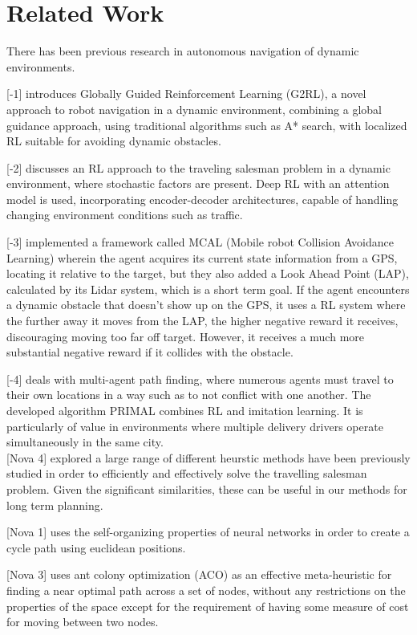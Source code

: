 \documentclass{article}
\begin{document}
	\section{Related Work}
	
	There has been previous research in autonomous navigation of dynamic environments. 
	
	[-1] introduces Globally Guided Reinforcement Learning (G2RL), a novel approach to robot navigation in a dynamic environment, combining a global guidance approach, using traditional algorithms such as A* search, with localized RL suitable for avoiding dynamic obstacles.
	
	[-2] discusses an RL approach to the traveling salesman problem in a dynamic environment, where stochastic factors are present. Deep RL with an attention model is used, incorporating encoder-decoder architectures, capable of handling changing environment conditions such as traffic. 
	
	[-3] implemented a framework called MCAL (Mobile robot Collision Avoidance Learning) wherein the agent acquires its current state information from a GPS, locating it relative to the target, but they also added a Look Ahead Point (LAP), calculated by its Lidar system, which is a short term goal. If the agent encounters a dynamic obstacle that doesn’t show up on the GPS, it uses a RL system where the further away it moves from the LAP, the higher negative reward it receives, discouraging moving too far off target. However, it receives a much more substantial negative reward if it collides with the obstacle.
	
	[-4] deals with multi-agent path finding, where numerous agents must travel to their own locations in a way such as to not conflict with one another. The developed algorithm PRIMAL combines RL and imitation learning. It is particularly of value in environments where multiple delivery drivers operate simultaneously in the same city.
	\\

	[Nova 4] explored a large range of different heurstic methods have been previously studied in order to efficiently and effectively solve the travelling salesman problem. Given the significant similarities, these can be useful in our methods for long term planning.
	
	[Nova 1] uses the self-organizing properties of neural networks in order to create a cycle path using euclidean positions.
	
	[Nova 3] uses ant colony optimization (ACO) as an effective meta-heuristic for finding a near optimal path across a set of nodes, without any restrictions on the properties of the space except for the requirement of having some measure of cost for moving between two nodes.
\end{document}

